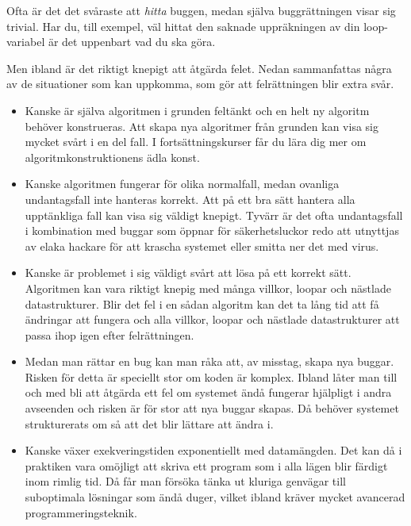 Ofta är det det svåraste att \emph{hitta} buggen, medan själva buggrättningen visar sig trivial. Har du, till exempel, väl hittat den saknade uppräkningen av din loop-variabel är det uppenbart vad du ska göra.

Men ibland är det riktigt knepigt att åtgärda felet. Nedan sammanfattas några av de situationer som kan uppkomma, som gör att felrättningen blir extra svår. 

\begin{itemize}
\item Kanske är själva algoritmen i grunden feltänkt och en helt ny algoritm behöver konstrueras. Att skapa nya algoritmer från grunden kan visa sig mycket svårt i en del fall. I fortsättningskurser får du lära dig mer om algoritmkonstruktionens ädla konst.

\item Kanske algoritmen fungerar för olika normalfall, medan ovanliga undantagsfall inte hanteras korrekt. Att på ett bra sätt hantera alla upptänkliga fall kan visa sig väldigt knepigt. Tyvärr är det ofta undantagsfall i kombination med buggar som öppnar för säkerhetsluckor redo att utnyttjas av elaka hackare för att krascha systemet eller smitta ner det med virus.

\item Kanske är problemet i sig väldigt svårt att lösa på ett korrekt sätt. Algoritmen kan vara riktigt knepig med många villkor, loopar och nästlade datastrukturer. Blir det fel i en sådan algoritm kan det ta lång tid att få ändringar att fungera och alla villkor, loopar och nästlade datastrukturer att passa ihop igen efter felrättningen. 

\item Medan man rättar en bug kan man råka att, av misstag, skapa nya buggar. Risken för detta är speciellt stor om koden är komplex. Ibland låter man till och med bli att åtgärda ett fel om systemet ändå fungerar hjälpligt i andra avseenden och risken är för stor att nya buggar skapas. Då behöver systemet strukturerats om så att det blir lättare att ändra i.

\item Kanske växer exekveringstiden exponentiellt med datamängden. Det kan då i praktiken vara omöjligt att skriva ett program som i alla lägen blir färdigt inom rimlig tid. Då får man försöka tänka ut kluriga genvägar till suboptimala lösningar som ändå duger, vilket ibland kräver mycket avancerad programmeringsteknik.
 
\end{itemize}

